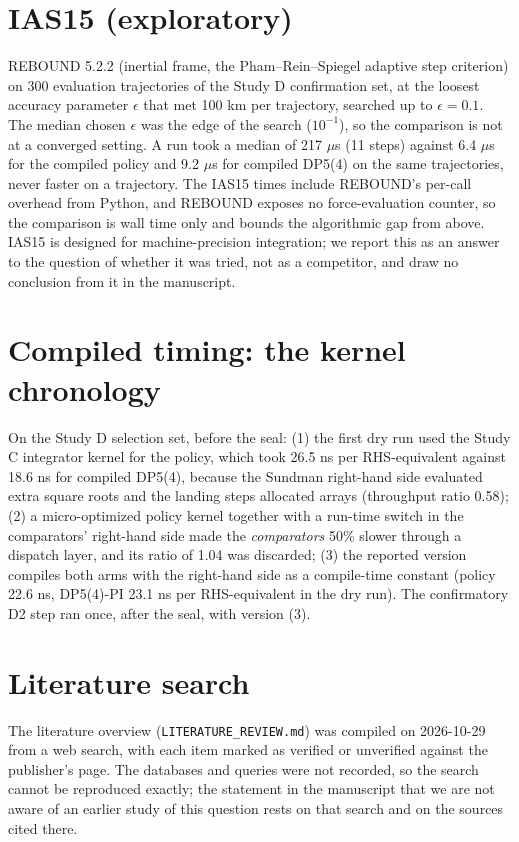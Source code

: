 \documentclass[10pt,letterpaper]{article}
\begin{document}
\section{IAS15 (exploratory)}
\label{sec:ias15}
REBOUND 5.2.2 (inertial frame, the Pham--Rein--Spiegel adaptive step criterion) on 300 evaluation trajectories of the Study D confirmation set, at
the loosest accuracy parameter $\epsilon$ that met 100 km per trajectory, searched up to $\epsilon = 0.1$. The median chosen $\epsilon$ was the edge of the
search ($10^{-1}$), so the comparison is not at a converged setting. A run took a median of 217 $\mu$s (11 steps) against 6.4 $\mu$s for the compiled
policy and 9.2 $\mu$s for compiled DP5(4) on the same trajectories, never faster on a trajectory. The IAS15 times include REBOUND's per-call overhead
from Python, and REBOUND exposes no force-evaluation counter, so the comparison is wall time only and bounds the algorithmic gap from above. IAS15 is
designed for machine-precision integration; we report this as an answer to the question of whether it was tried, not as a competitor, and draw no
conclusion from it in the manuscript.

\section{Compiled timing: the kernel chronology}
\label{sec:d2}
On the Study D selection set, before the seal: (1) the first dry run used the Study C integrator kernel for the policy, which took 26.5 ns per
RHS-equivalent against 18.6 ns for compiled DP5(4), because the Sundman right-hand side evaluated extra square roots and the landing steps allocated
arrays (throughput ratio 0.58); (2) a micro-optimized policy kernel together with a run-time switch in the comparators' right-hand side made the
\emph{comparators} 50\% slower through a dispatch layer, and its ratio of 1.04 was discarded; (3) the reported version compiles both arms with the
right-hand side as a compile-time constant (policy 22.6 ns, DP5(4)-PI 23.1 ns per RHS-equivalent in the dry run). The confirmatory D2 step ran once,
after the seal, with version (3).

\section{Literature search}
\label{sec:lit}
The literature overview (\texttt{LITERATURE\_REVIEW.md}) was compiled on 2026-10-29 from a web search, with each item marked as verified or
unverified against the publisher's page. The databases and queries were not recorded, so the search cannot be reproduced exactly; the statement in
the manuscript that we are not aware of an earlier study of this question rests on that search and on the sources cited there.
\end{document}
